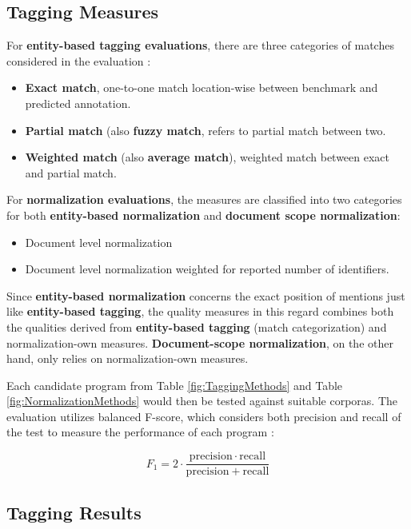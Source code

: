 \subsection{Tagging Measures}

\label{ssection:TaggingMeasures}

For \textbf{entity-based tagging evaluations}, there are three categories of matches considered in the evaluation \citep{ofner2015evaluation}:

\begin{itemize}
\item \textbf{Exact match}, one-to-one match location-wise between benchmark and predicted annotation.
\item \textbf{Partial match} (also \textbf{fuzzy match}, refers to partial match between two.
\item \textbf{Weighted match} (also \textbf{average match}), weighted match between exact and partial match.
\end{itemize}

For \textbf{normalization evaluations}, the measures are classified into two categories for both \textbf{entity-based normalization} and \textbf{document scope normalization}:

\begin{itemize}
\item Document level normalization
\item Document level normalization weighted for reported number of identifiers.
\end{itemize}

Since \textbf{entity-based normalization} concerns the exact position of mentions just like \textbf{entity-based tagging}, the quality measures in this regard combines both the qualities derived from \textbf{entity-based tagging} (match categorization) and normalization-own measures. \textbf{Document-scope normalization}, on the other hand, only relies on normalization-own measures.

Each candidate program from Table \ref{fig:TaggingMethods} and Table \ref{fig:NormalizationMethods} would then be tested against suitable corporas. The evaluation utilizes balanced F-score, which considers both precision and recall of the test to measure the performance of each program \citep{salton1986introduction}:

$$
F_1 = 2 \cdot \frac{\mathrm{precision} \cdot \mathrm{recall}}{\mathrm{precision} + \mathrm{recall}}
$$


\subsection{Tagging Results}

